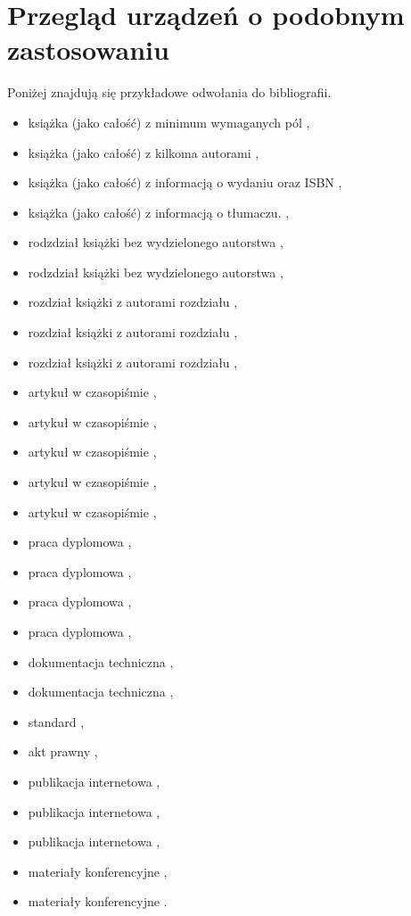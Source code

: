 \section{Przegląd urządzeń o podobnym zastosowaniu}

\noindent Poniżej znajdują się przykładowe odwołania do bibliografii. 


\begin{itemize} \footnotesize
    \item książka (jako całość) z minimum wymaganych pól \cite{Gorski2023},
    \item książka (jako całość) z kilkoma autorami \cite{Kurczab2016},
    \item książka (jako całość) z informacją o wydaniu oraz ISBN \cite{Rowling2000},
    \item książka (jako całość) z informacją o tłumaczu. \cite{AlKhalili2022},
    \item rodzdział książki bez wydzielonego autorstwa \cite{Smith2018},
    \item rodzdział książki bez wydzielonego autorstwa \cite{Peterson2019},
    \item rozdział książki z autorami rozdziału \cite{Kraus2010},
    \item rozdział książki z autorami rozdziału \cite{Isidori2023},
    \item rozdział książki z autorami rozdziału \cite{Gregerson2010},
    \item artykuł w czasopiśmie \cite{Nowak2023},
    \item artykuł w czasopiśmie \cite{Xu2023},
    \item artykuł w czasopiśmie \cite{Mashatan2007},
    \item artykuł w czasopiśmie \cite{Hwang2006},
    \item artykuł w czasopiśmie \cite{Joye2007},
    \item praca dyplomowa \cite{Cwik2018},
    \item praca dyplomowa \cite{Marszalek2023},
    \item praca dyplomowa \cite{Urbanski2023},
    \item praca dyplomowa \cite{Otto2004},
    \item dokumentacja techniczna \cite{LPC2212},
    \item dokumentacja techniczna \cite{NIST-SP-800-22},
    \item standard \cite{FIPS140-2},
    \item akt prawny \cite{ust2001-09-18},
    \item publikacja internetowa \cite{Schneier2017},
    \item publikacja internetowa \cite{Craddock2017},
    \item publikacja internetowa \cite{MatlabPerformance2015},
    \item materiały konferencyjne \cite{Duckworth2019},
    \item materiały konferencyjne \cite{Jun2006}.
\end{itemize}

